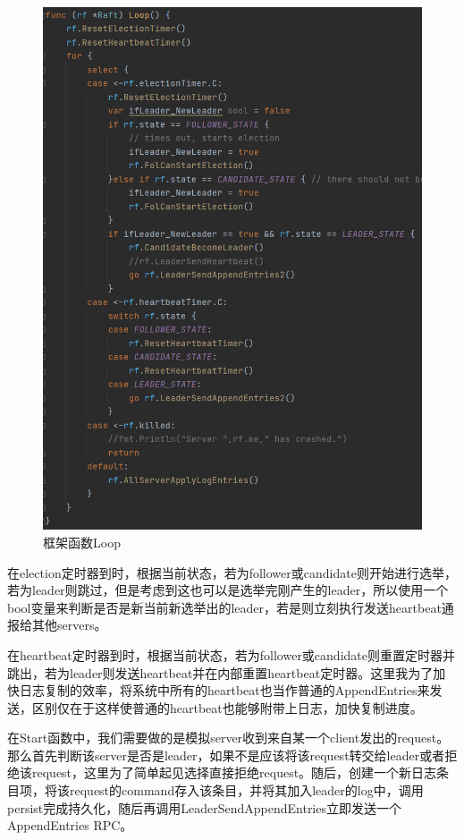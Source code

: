 \documentclass[UTF8]{article}
\begin{document}
\begin{figure}[h]
  \centering
  \includegraphics[scale=0.3]{pic1.png}
  \caption{框架函数Loop}
\end{figure}

在election定时器到时，根据当前状态，若为follower或candidate则开始进行选举，若为leader则跳过，但是考虑到这也可以是选举完刚产生的leader，所以使用一个bool变量来判断是否是新当前新选举出的leader，若是则立刻执行发送heartbeat通报给其他servers。

在heartbeat定时器到时，根据当前状态，若为follower或candidate则重置定时器并跳出，若为leader则发送heartbeat并在内部重置heartbeat定时器。这里我为了加快日志复制的效率，将系统中所有的heartbeat也当作普通的AppendEntries来发送，区别仅在于这样使普通的heartbeat也能够附带上日志，加快复制进度。

在Start函数中，我们需要做的是模拟server收到来自某一个client发出的request。那么首先判断该server是否是leader，如果不是应该将该request转交给leader或者拒绝该request，这里为了简单起见选择直接拒绝request。随后，创建一个新日志条目项，将该request的command存入该条目，并将其加入leader的log中，调用persist完成持久化，随后再调用LeaderSendAppendEntries立即发送一个AppendEntries RPC。
\end{document}
